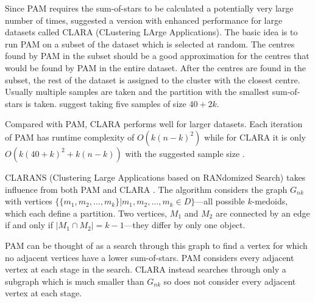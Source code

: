 \documentclass[a4paper]{report}
\newcommand{\dset}{D}
\begin{document}
Since PAM requires the sum-of-stars to be calculated a potentially very large
number of times, \citet{kaufman2005finding} suggested a version with enhanced
performance for large datasets called CLARA (CLustering LArge Applications).
The basic idea is to run PAM on a subset of the dataset which is selected at
random.  The centres found by PAM in the subset should be a good approximation
for the centres that would be found by PAM in the entire dataset.  After the
centres are found in the subset, the rest of the dataset is assigned to the
cluster with the closest centre.  Usually multiple samples are taken and the
partition with the smallest sum-of-stars is taken.  \citet{kaufman2005finding}
suggest taking five samples of size $40+2k$.

Compared with PAM, CLARA performs well for larger datasets.  Each iteration of
PAM has runtime complexity of $O(k(n-k)^2)$ while for CLARA it is only
$O(k(40+k)^2 + k(n-k))$ with the suggested sample size \citep{ng2002clarans}.

CLARANS (Clustering Large Applications based on RANdomized Search) takes
influence from both PAM and CLARA \citep{ng2002clarans}.  The algorithm
considers the graph $G_{nk}$ with vertices $\{\{m_1,m_2,\dotsc,m_k\} |
m_1,m_2,\dotsc,m_k \in \dset\}$---all possible $k$-medoids, which each define
a partition.  Two vertices, $M_1$ and $M_2$ are connected by an edge if and
only if $|M_1 \cap M_2| = k-1$---they differ by only one object.

PAM can be thought of as a search through this graph to find a vertex for
which no adjacent vertices have a lower sum-of-stars.  PAM considers every
adjacent vertex at each stage in the search.  CLARA instead searches through
only a subgraph which is much smaller than $G_{nk}$ so does not consider every
adjacent vertex at each stage.
\end{document}
